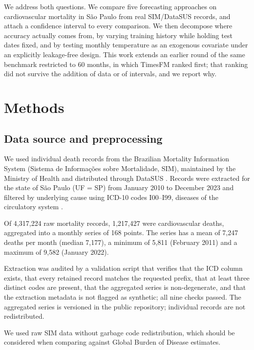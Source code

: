 We address both questions. We compare five forecasting approaches on cardiovascular
mortality in S\~ao Paulo from real SIM/DataSUS records, and attach a confidence interval to
every comparison. We then decompose where accuracy actually comes from, by varying training
history while holding test dates fixed, and by testing monthly temperature as an exogenous
covariate under an explicitly leakage-free design. This work extends an earlier round of the
same benchmark restricted to 60 months, in which TimesFM ranked first; that ranking did not
survive the addition of data or of intervals, and we report why.

\section{Methods}\label{sec:metodos}

\subsection{Data source and preprocessing}

We used individual death records from the Brazilian Mortality Information System (Sistema
de Informa\c{c}\~oes sobre Mortalidade, SIM), maintained by the Ministry of Health and
distributed through DataSUS \citep{datasus}. Records were extracted for the state of
S\~ao Paulo (UF = SP) from January 2010 to December 2023 and filtered by underlying cause
using ICD-10 codes I00--I99, diseases of the circulatory system \citep{icd10}.

Of 4{,}317{,}224 raw mortality records, 1{,}217{,}427 were cardiovascular deaths, aggregated
into a monthly series of 168 points. The series has a mean of 7{,}247 deaths per month
(median 7{,}177), a minimum of 5{,}811 (February 2011) and a maximum of 9{,}582 (January
2022).

Extraction was audited by a validation script that verifies that the ICD column exists,
that every retained record matches the requested prefix, that at least three distinct codes
are present, that the aggregated series is non-degenerate, and that the extraction metadata
is not flagged as synthetic; all nine checks passed. The aggregated series is versioned in
the public repository; individual records are not redistributed.

We used raw SIM data without garbage code redistribution, which should be considered
when comparing against Global Burden of Disease estimates.

